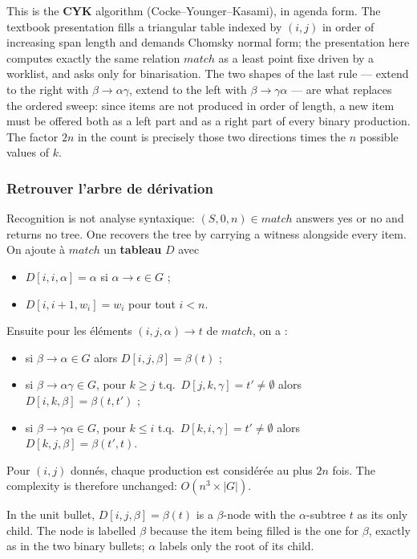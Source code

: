 \begin{remark}
  This is the \textbf{CYK} algorithm (Cocke--Younger--Kasami), in agenda form.
  The textbook presentation fills a triangular table indexed by $(i,j)$ in order
  of increasing span length and demands Chomsky normal form; the presentation
  here computes exactly the same relation $\mathit{match}$ as a least point fixe
  driven by a worklist, and asks only for binarisation. The two shapes of the
  last rule --- extend to the right with $\beta \to \alpha\gamma$, extend to the
  left with $\beta \to \gamma\alpha$ --- are what replaces the ordered sweep:
  since items are not produced in order of length, a new item must be offered
  both as a left part and as a right part of every binary production. The factor
  $2n$ in the count is precisely those two directions times the $n$ possible
  values of $k$.
\end{remark}

\subsubsection{Retrouver l'arbre de dérivation}
Recognition is not analyse syntaxique: $(S,0,n) \in \mathit{match}$ answers yes
or no and returns no tree. One recovers the tree by carrying a witness alongside
every item. On ajoute à $\mathit{match}$ un \textbf{tableau} $D$ avec
\begin{itemize}
  \item $D[i,i,\alpha] = \alpha$ si $\alpha \to \epsilon \in G$ ;
  \item $D[i,i+1,w_{i}] = w_{i}$ pour tout $i < n$.
\end{itemize}
Ensuite pour les éléments $(i,j,\alpha) \to t$ de $\mathit{match}$, on a :
\begin{itemize}
  \item si $\beta \to \alpha \in G$ alors $D[i,j,\beta] = \beta(t)$ ;
  \item si $\beta \to \alpha\gamma \in G$, pour $k \geq j$ t.q.\
    $D[j,k,\gamma] = t' \neq \emptyset$ alors $D[i,k,\beta] = \beta(t,t')$ ;
  \item si $\beta \to \gamma\alpha \in G$, pour $k \leq i$ t.q.\
    $D[k,i,\gamma] = t' \neq \emptyset$ alors $D[k,j,\beta] = \beta(t',t)$.
\end{itemize}
Pour $(i,j)$ donnés, chaque production est considérée au plus $2n$ fois. The
complexity is therefore unchanged: $O(n^{3} \times |G|)$.

\begin{remark}
  In the unit bullet, $D[i,j,\beta] = \beta(t)$ is a $\beta$-node with the
  $\alpha$-subtree $t$ as its only child. The node is labelled $\beta$ because
  the item being filled is the one for $\beta$, exactly as in the two binary
  bullets; $\alpha$ labels only the root of its child.
\end{remark}

